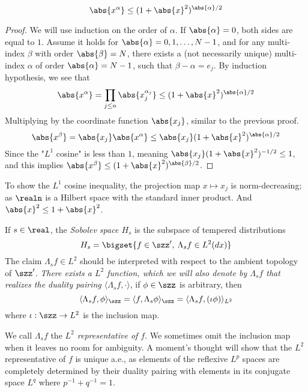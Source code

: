 \documentclass[../main-v2-manifolds.tex]{subfiles}
\begin{document}
\begin{note}
\begin{lemma}
\begin{equation}
\abs{x^{\alpha}} \leq (1+\abs{x}^2)^{\abs{\alpha}/2}
\label{eq:multi-index power bounded by sobolev factor}
\end{equation}
\end{lemma}
\begin{proof}
We will use induction on the order of $\alpha$. If $\abs{\alpha}=0$, both sides are equal to $1$. Assume it holds for $\abs{\alpha} = 0,1,\ldots, N-1$, and for any multi-index $\beta$ with order $\abs{\beta} = N$, there exists a (not necessarily unique) multi-index $\alpha$ of order $\abs{\alpha} = N-1$, such that $\beta-\alpha = e_j$. By induction hypothesis, we see that 
\[
\abs{x^{\alpha}} = \prod_{j\leq n} \abs{x^{\alpha_j}_{j}}\leq (1+\abs{x}^2)^{\abs{\alpha}/2}
\]
Multiplying by the coordinate function $\abs{x_j}$, similar to the previous proof. 
\[
\abs{x^{\beta}} = \abs{x_j} \abs{x^{\alpha}}\leq \abs{x_j}  (1+\abs{x}^2)^{\abs{\alpha}/2}
\]
Since the "$L^1$ cosine" is less than $1$, meaning $\abs{x_j}(1+\abs{x}^2)^{-1/2}\leq 1$, and this implies $\abs{x^{\beta}}\leq (1+\abs{x}^2)^{\abs{\beta}/2}$.
\end{proof}
\begin{remark}
To show the $L^1$ cosine inequality, the projection map $x\mapsto x_j$ is norm-decreasing; as $\realn$ is a Hilbert space with the standard inner product. And $\abs{x}^2\leq 1 + \abs{x} ^2$.
\end{remark}
\end{note}

\begin{definition}
If $s\in\real$, the \emph{Sobolev space $H_s$} is the subspace of tempered distributions
\[
H_s = \bigset{f\in \szz',\: \Lambda_sf\in L^2(dx)}
\]
The claim $\Lambda_sf\in L^2$ should be interpreted with respect to the ambient topology of $\szz'$. \emph{There exists a $L^2$ function, which we will also denote by $\Lambda_sf$ that realizes the duality pairing $\langle \Lambda_s f, \cdot\rangle$}, if $\phi\in\szz$ is arbitrary, then
\[
\langle \Lambda_s f,\phi\rangle_{\szz} = \langle f, \Lambda_s \phi\rangle_{\szz} = \langle \Lambda_s f,  (\iota\phi)\rangle_{L^2} 
\]
where $\iota: \szz\to L^2$ is the inclusion map.
\end{definition}

We call $\Lambda_s f$ the \emph{$L^2$ representative of $f$}. We sometimes omit the inclusion map when it leaves no room for ambiguity. A moment's thought will show that the $L^2$ representative of $f$ is unique a.e., as elements of the reflexive $L^p$ spaces are completely determined by their duality pairing with elements in its conjugate space $L^q$ where $p^{-1}+q^{-1}=1$.\\
\end{document}
